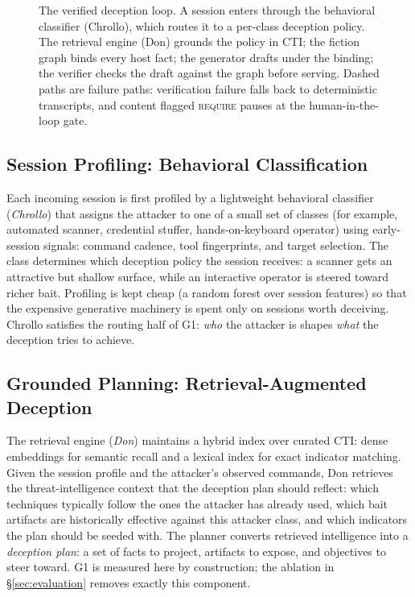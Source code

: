 
\begin{figure}[t]
\centering

\caption{The verified deception loop. A session enters through the
behavioral classifier (Chrollo), which routes it to a per-class deception
policy. The retrieval engine (Don) grounds the policy in CTI; the fiction
graph binds every host fact; the generator drafts under the binding; the
verifier checks the draft against the graph before serving. Dashed paths
are failure paths: verification failure falls back to deterministic
transcripts, and content flagged \textsc{require} pauses at the
human-in-the-loop gate.}
\label{fig:architecture}
\end{figure}

\subsection{Session Profiling: Behavioral Classification}
\label{sec:chrollo}
Each incoming session is first profiled by a lightweight behavioral
classifier (\emph{Chrollo}) that assigns the attacker to one of a small
set of classes (for example, automated scanner, credential stuffer,
hands-on-keyboard operator) using early-session signals: command cadence,
tool fingerprints, and target selection. The class determines which
deception policy the session receives: a scanner gets an attractive but
shallow surface, while an interactive operator is steered toward richer
bait. Profiling is kept cheap (a random forest over session features)
so that the expensive generative machinery is spent only on sessions
worth deceiving. Chrollo
satisfies the routing half of G1: \emph{who} the attacker is shapes
\emph{what} the deception tries to achieve.

\subsection{Grounded Planning: Retrieval-Augmented Deception}
\label{sec:don}
The retrieval engine (\emph{Don}) maintains a hybrid index over curated
CTI: dense embeddings for semantic recall and a lexical index for exact
indicator matching. Given the session profile and the attacker's observed
commands, Don retrieves the threat-intelligence context that the deception
plan should reflect: which techniques typically follow the ones the
attacker has already used, which bait artifacts are historically
effective
against this attacker class, and which indicators the plan should
be
seeded with. The planner converts retrieved intelligence into a
\emph{deception plan}: a set of facts to project, artifacts to expose, and
objectives to steer toward. G1 is measured here by construction; the
ablation in \S\ref{sec:evaluation} removes exactly this component.

